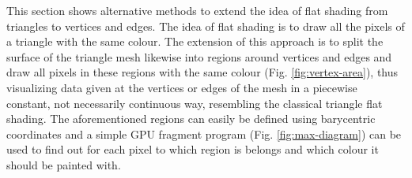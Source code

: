 \label{section:vertex-area-chapter}
This section shows alternative methods to extend the idea of flat shading from triangles to vertices and edges. The idea of flat shading is to draw all the pixels of a triangle with the same colour. The extension of this approach is to split the surface of the triangle mesh likewise into regions around vertices and edges and draw all pixels in these regions with the same colour (Fig. \ref{fig:vertex-area}), thus visualizing data given at the vertices or edges of the mesh in a piecewise constant, not necessarily continuous way, resembling the classical triangle flat shading. The aforementioned regions can easily be defined using barycentric coordinates and a simple GPU fragment program (Fig. \ref{fig:max-diagram}) can be used to find out for each pixel to which region is belongs and which colour it should be painted with.



